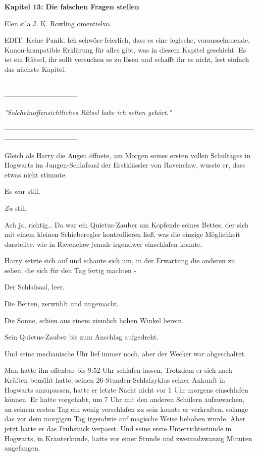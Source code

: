 

\hypertarget{die-falschen-fragen-stellen}{%

\textbf{Kapitel 13: Die falschen Fragen stellen\\ }

Elen sila J. K. Rowling omentielvo.

EDIT: Keine Panik. Ich schwöre feierlich, dass es eine logische, vorausschauende, Kanon-kompatible Erklärung für alles gibt, was in diesem Kapitel geschieht. Es ist ein Rätsel, ihr sollt versuchen es zu lösen und schafft ihr es nicht, lest einfach das nächste Kapitel.

--------------------------------------------------------------------------------------------------------------------------------------------

\emph{"Solcheinoffensichtliches Rätsel habe ich selten gehört."}

--------------------------------------------------------------------------------------------------------------------------------------------

Gleich als Harry die Augen öffnete, am Morgen seines ersten vollen Schultages in Hogwarts im Jungen-Schlafsaal der Erstklässler von Ravenclaw, wusste er, dass etwas nicht stimmte.

Es war still.

\emph{Zu} still.

Ach ja, richtig… Da war ein Quietus-Zauber am Kopfende seines Bettes, der sich mit einem kleinen Schieberegler kontrollieren ließ, was die einzige Möglichkeit darstellte, wie in Ravenclaw jemals irgendwer einschlafen konnte.

Harry setzte sich auf und schaute sich um, in der Erwartung die anderen zu sehen, die sich für den Tag fertig machten -

Der Schlafsaal, leer.

Die Betten, zerwühlt und ungemacht.

Die Sonne, schien aus einem ziemlich hohen Winkel herein.

Sein Quietus-Zauber bis zum Anschlag aufgedreht.

Und seine mechanische Uhr lief immer noch, aber der Wecker war abgeschaltet.

Man hatte ihn offenbar bis 9:52 Uhr schlafen lassen. Trotzdem er sich nach Kräften bemüht hatte, seinen 26-Stunden-Schlafzyklus seiner Ankunft in Hogwarts anzupassen, hatte er letzte Nacht nicht vor 1 Uhr morgens einschlafen können. Er hatte vorgehabt, um 7 Uhr mit den anderen Schülern aufzuwachen, an seinem ersten Tag ein wenig verschlafen zu sein konnte er verkraften, solange das vor dem morgigen Tag irgendwie auf magische Weise behoben wurde. Aber jetzt hatte er das Frühstück verpasst. Und seine erste Unterrichtsstunde in Hogwarts, in Kräuterkunde, hatte vor einer Stunde und zweiundzwanzig Minuten angefangen.

}
